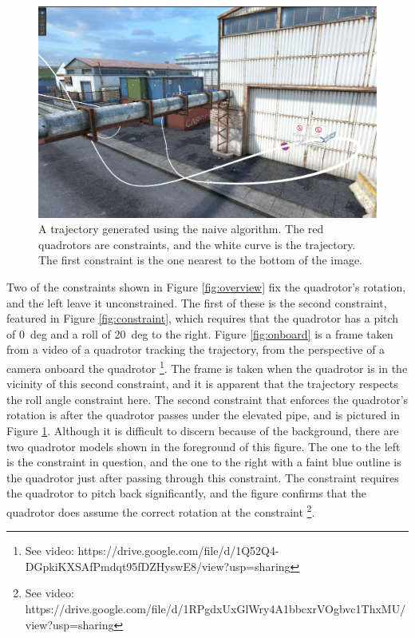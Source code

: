 \documentclass[pageno]{jpaper}
\begin{document}
\begin{figure}[hbt]
  \includegraphics[width=\linewidth]{data/rotation.png}
  \caption{A trajectory generated using the naive algorithm. The red quadrotors are constraints, and the white curve is the trajectory. The first constraint is the one nearest to the bottom of the image.}
  \label{fig:rotation}
\end{figure}

Two of the constraints shown in Figure \ref{fig:overview} fix the quadrotor's rotation, and the left leave it unconstrained. The first of these is the second constraint, featured in Figure \ref{fig:constraint}, which requires that the quadrotor has a pitch of \qty{0}{deg} and a roll of \qty{20}{deg} to the right. Figure \ref{fig:onboard} is a frame taken from a video of a quadrotor tracking the trajectory, from the perspective of a camera onboard the quadrotor \footnote{See video: https://drive.google.com/file/d/1Q52Q4-DGpkiKXSAfPmdqt95fDZHyswE8/view?usp=sharing}. The frame is taken when the quadrotor is in the vicinity of this second constraint, and it is apparent that the trajectory respects the roll angle constraint here. The second constraint that enforces the quadrotor's rotation is after the quadrotor passes under the elevated pipe, and is pictured in Figure \ref{fig:rotation}. Although it is difficult to discern because of the background, there are two quadrotor models shown in the foreground of this figure. The one to the left is the constraint in question, and the one to the right with a faint blue outline is the quadrotor just after passing through this constraint. The constraint requires the quadrotor to pitch back significantly, and the figure confirms that the quadrotor does assume the correct rotation at the constraint \footnote{See video: https://drive.google.com/file/d/1RPgdxUxGlWry4A1bbcxrVOgbvc1ThxMU/view?usp=sharing}.
\end{document}

